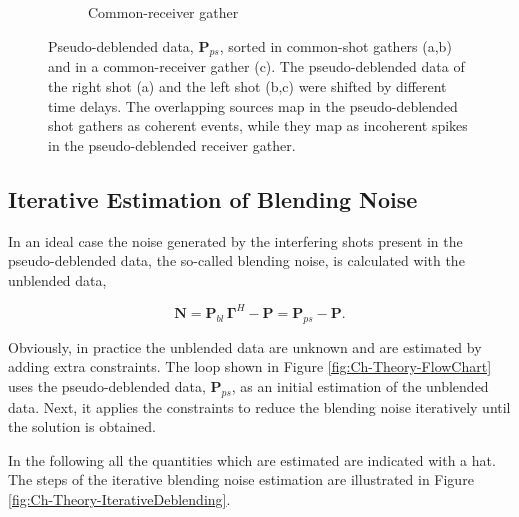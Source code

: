 \begin{figure}
\begin{subfigure}[t]{0.25\textwidth}
		\caption{Common-receiver gather}
		\label{fig:Ch-Theory-PseudoDeblendedCRG}
	\end{subfigure}
	\caption{Pseudo-deblended data, $\mathbf{P}_{ps}$, sorted in common-shot gathers (a,b) and in a common-receiver gather (c). The pseudo-deblended data of the right shot (a) and the left shot (b,c) were shifted by different time delays. The overlapping sources map in the pseudo-deblended shot gathers as coherent events, while they map as incoherent spikes in the pseudo-deblended receiver gather.}
	\label{fig:Ch-Theory-PseudoDeblended}

\end{figure}


\subsection{Iterative Estimation of Blending Noise} \label{sec:IterBlenNoiseEst}

In an ideal case the noise generated by the interfering shots present in the pseudo-deblended data, the so-called blending noise, is calculated with the unblended data, 

\begin{equation}
	\mathbf{N} = \mathbf{P}_{bl} \, \mathbf{\Gamma}^H - \mathbf{P} = \mathbf{P}_{ps} - \mathbf{P}.
	\label{eq:Ch-Theory-Noise}
\end{equation}

Obviously, in practice the unblended data are unknown and are estimated by adding extra constraints. The loop shown in Figure \ref{fig:Ch-Theory-FlowChart} uses the pseudo-deblended data, $\mathbf{P}_{ps}$, as an initial estimation of the unblended data. Next, it applies the constraints to reduce the blending noise iteratively until the solution is obtained. 

In the following all the quantities which are estimated are indicated with a hat. The steps of the iterative blending noise estimation are illustrated in Figure \ref{fig:Ch-Theory-IterativeDeblending}.

